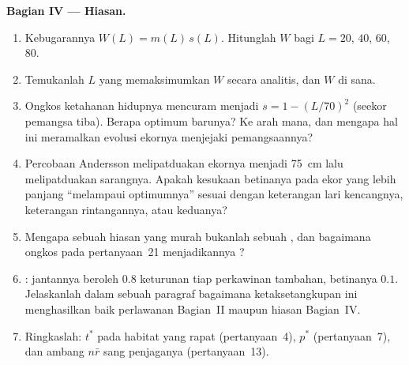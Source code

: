 \begin{problem}
\medskip
\noindent\textbf{Bagian IV --- Hiasan.}
\begin{enumerate}[resume]
  \item Kebugarannya $W(L) = m(L)\,s(L)$. Hitunglah $W$ bagi $L = 20$, $40$, $60$,
        $80$.
  \item Temukanlah $L$ yang memaksimumkan $W$ secara analitis, dan $W$ di sana.
  \item Ongkos ketahanan hidupnya mencuram menjadi $s = 1 - (L/70)^{2}$ (seekor pemangsa
        tiba). Berapa optimum barunya? Ke arah mana, dan mengapa hal ini
        meramalkan evolusi ekornya menjejaki pemangsaannya?
  \item Percobaan Andersson melipatduakan ekornya menjadi \qty{75}{cm} lalu melipatduakan
        sarangnya. Apakah kesukaan betinanya pada ekor yang lebih panjang ``melampaui
        optimumnya'' sesuai dengan keterangan lari kencangnya, keterangan rintangannya,
        atau keduanya?
  \item Mengapa sebuah hiasan yang murah bukanlah sebuah , dan bagaimana
        ongkos pada pertanyaan~21 menjadikannya ?
  \item {}: jantannya beroleh $0.8$ keturunan tiap perkawinan tambahan,
        betinanya $0.1$. Jelaskanlah dalam sebuah paragraf bagaimana ketaksetangkupan ini
        menghasilkan baik perlawanan Bagian~II maupun hiasan
        Bagian~IV.
  \item Ringkaslah: $t^{*}$ pada habitat yang rapat (pertanyaan~4), $p^{*}$
        (pertanyaan~7), dan ambang $n\bar r$ sang penjaganya
        (pertanyaan~13).
\end{enumerate}
\end{problem}
